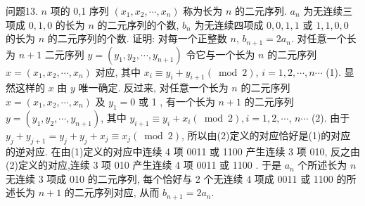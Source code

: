 问题13. $n$ 项的 0,1 序列 $\left(x_1, x_2, \cdots, x_n\right)$ 称为长为 $n$ 的二元序列.
$a_n$ 为无连续三项成 $0,1,0$ 的长为 $n$ 的二元序列的个数, $b_n$ 为无连续四项成 $0,0,1,1$ 或 $1,1,0,0$ 的长为 $n$ 的二元序列的个数.
证明: 对每一个正整数 $n$, $b_{n+1}=2 a_n$. 
对任意一个长为 $n+1$ 二元序列 $y=\left(y_1, y_2, \cdots, y_{n+1}\right)$ 令它与一个长为 $n$ 的二元序列 $x=\left(x_1, x_2, \cdots, x_n\right)$ 对应, 其中 $x_i \equiv y_i+y_{i+1}(\bmod 2)$, $i=1,2, \cdots, n \cdots$ (1). 
显然这样的 $x$ 由 $y$ 唯一确定.
反过来, 对任意一个长为 $n$ 的二元序列 $x=\left(x_1, x_2, \cdots, x_n\right)$ 及 $y_1=0$ 或 1 , 有一个长为 $n+1$ 的二元序列 $y=\left(y_1, y_2, \cdots, y_{n+1}\right)$, 其中 $y_{i+1} \equiv y_i+x_i(\bmod 2), i=1,2, \cdots$, $n \cdots$ (2). 
由于 $y_j+y_{j+1}=y_j+y_j+x_j \equiv x_j(\bmod 2)$, 所以由(2)定义的对应恰好是(1)的对应的逆对应.
在由(1)定义的对应中连续 4 项 0011 或 1100 产生连续 3 项 010, 反之由(2)定义的对应,连续 3 项 010 产生连续 4 项 0011 或 1100 . 于是 $a_n$ 个所述长为 $n$ 无连续 3 项成 010 的二元序列, 每个恰好与 2 个无连续 4 项成 0011 或 1100 的所述长为 $n+1$ 的二元序列对应, 从而 $b_{n+1}=2 a_n$.


